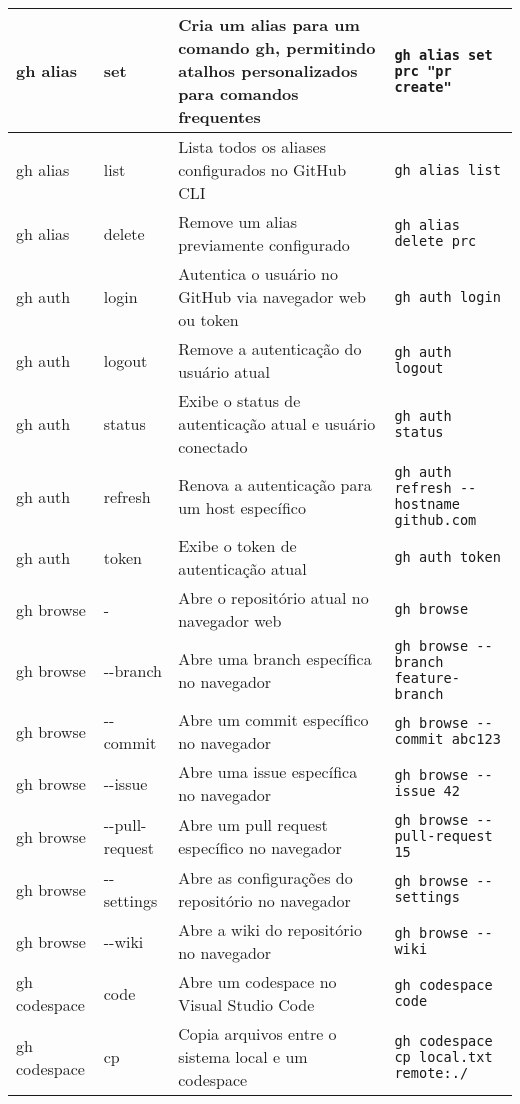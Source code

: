 \begin{longtable}{|p{2cm}|p{2.3cm}|p{4cm}|p{6cm}|}
    gh alias & set & Cria um alias para um comando gh, permitindo atalhos personalizados para comandos frequentes & \texttt{gh alias set prc "pr create"} \\
    \hline
    gh alias & list & Lista todos os aliases configurados no GitHub CLI & \texttt{gh alias list} \\
    \hline
    gh alias & delete & Remove um alias previamente configurado & \texttt{gh alias delete prc} \\
    \hline
    gh auth & login & Autentica o usuário no GitHub via navegador web ou token & \texttt{gh auth login} \\
    \hline
    gh auth & logout & Remove a autenticação do usuário atual & \texttt{gh auth logout} \\
    \hline
    gh auth & status & Exibe o status de autenticação atual e usuário conectado & \texttt{gh auth status} \\
    \hline
    gh auth & refresh & Renova a autenticação para um host específico & \texttt{gh auth refresh -{-}hostname github.com} \\
    \hline
    gh auth & token & Exibe o token de autenticação atual & \texttt{gh auth token} \\
    \hline
    gh browse & - & Abre o repositório atual no navegador web & \texttt{gh browse} \\
    \hline
    gh browse & -{-}branch & Abre uma branch específica no navegador & \texttt{gh browse -{-}branch feature-branch} \\
    \hline
    gh browse & -{-}commit & Abre um commit específico no navegador & \texttt{gh browse -{-}commit abc123} \\
    \hline
    gh browse & -{-}issue & Abre uma issue específica no navegador & \texttt{gh browse -{-}issue 42} \\
    \hline
    gh browse & -{-}pull-request & Abre um pull request específico no navegador & \texttt{gh browse -{-}pull-request 15} \\
    \hline
    gh browse & -{-}settings & Abre as configurações do repositório no navegador & \texttt{gh browse -{-}settings} \\
    \hline
    gh browse & -{-}wiki & Abre a wiki do repositório no navegador & \texttt{gh browse -{-}wiki} \\
    \hline
    gh codespace & code & Abre um codespace no Visual Studio Code & \texttt{gh codespace code} \\
    \hline
    gh codespace & cp & Copia arquivos entre o sistema local e um codespace & \texttt{gh codespace cp local.txt remote:./} \\

\end{longtable}
